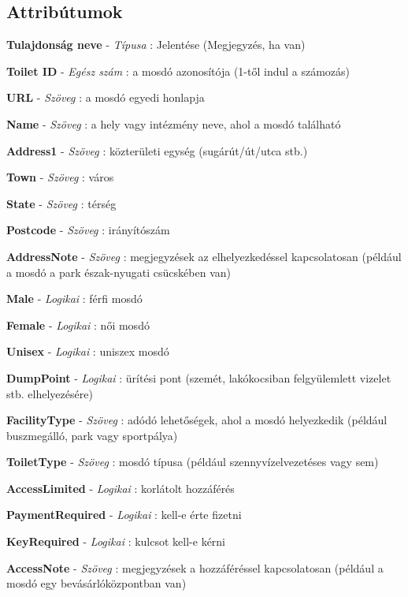 		\subsection{Attribútumok}
	\begin{compactlist}
		\item \textbf{Tulajdonság neve} - \textit{Típusa} : Jelentése (Megjegyzés, ha van)
		\item \textbf{Toilet ID} - \textit{Egész szám} : a mosdó azonosítója (1-től indul a számozás)
		\item \textbf{URL} - \textit{Szöveg} : a mosdó egyedi honlapja 
		\item \textbf{Name} - \textit{Szöveg} : a hely vagy intézmény neve, ahol a mosdó található
		\item \textbf{Address1} - \textit{Szöveg} : közterületi egység (sugárút/út/utca stb.)
		\item \textbf{Town} - \textit{Szöveg} : város
		\item \textbf{State} - \textit{Szöveg} : térség
		\item \textbf{Postcode} - \textit{Szöveg} : irányítószám
		\item \textbf{AddressNote} - \textit{Szöveg} : megjegyzések az elhelyezkedéssel kapcsolatosan (például a mosdó a park észak-nyugati csücskében van)
		\item \textbf{Male} - \textit{Logikai} : férfi mosdó
		\item \textbf{Female} - \textit{Logikai} : női mosdó
		\item \textbf{Unisex} - \textit{Logikai} : uniszex mosdó
		\item \textbf{DumpPoint} - \textit{Logikai} : ürítési pont (szemét, lakókocsiban felgyülemlett vizelet stb. elhelyezésére)
		\item \textbf{FacilityType} - \textit{Szöveg} : adódó lehetőségek, ahol a mosdó helyezkedik (például buszmegálló, park vagy sportpálya)
		\item \textbf{ToiletType} - \textit{Szöveg} : mosdó típusa (például szennyvízelvezetéses vagy sem)
		\item \textbf{AccessLimited} - \textit{Logikai} : korlátolt hozzáférés
		\item \textbf{PaymentRequired} - \textit{Logikai} : kell-e érte fizetni
		\item \textbf{KeyRequired} - \textit{Logikai} : kulcsot kell-e kérni
		\item \textbf{AccessNote} - \textit{Szöveg} : megjegyzések a hozzáféréssel kapcsolatosan (például a mosdó egy bevásárlóközpontban van)

\end{compactlist}
